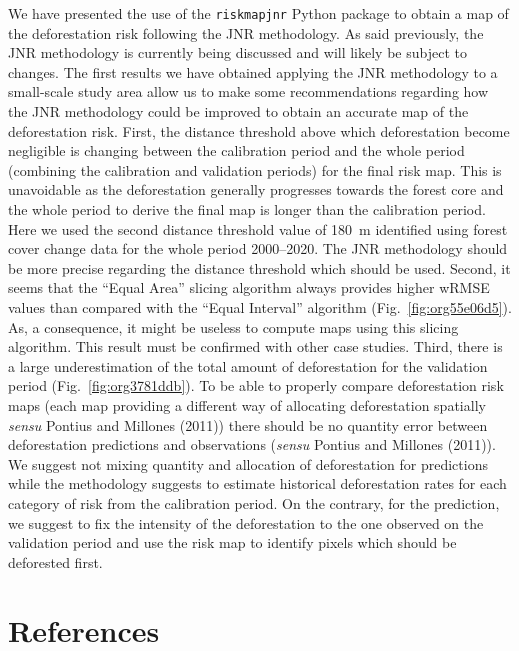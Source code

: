\documentclass[paper=a4, 12pt, DIV=12]{scrartcl}
\makeatletter
\newcommand{\citeprocitem}[2]{\hyper@linkstart{cite}{citeproc_bib_item_#1}#2\hyper@linkend}
\makeatother
\begin{document}
We have presented the use of the \texttt{riskmapjnr} Python package to obtain a map of the deforestation risk following the JNR methodology. As said previously, the JNR methodology is currently being discussed and will likely be subject to changes. The first results we have obtained applying the JNR methodology to a small-scale study area allow us to make some recommendations regarding how the JNR methodology could be improved to obtain an accurate map of the deforestation risk. First, the distance threshold above which deforestation become negligible is changing between the calibration period and the whole period (combining the calibration and validation periods) for the final risk map. This is unavoidable as the deforestation generally progresses towards the forest core and the whole period to derive the final map is longer than the calibration period. Here we used the second distance threshold value of 180 m identified using forest cover change data for the whole period 2000--2020. The JNR methodology should be more precise regarding the distance threshold which should be used. Second, it seems that the ``Equal Area'' slicing algorithm always provides higher wRMSE values than compared with the ``Equal Interval'' algorithm (Fig. \ref{fig:org55e06d5}). As, a consequence, it might be useless to compute maps using this slicing algorithm. This result must be confirmed with other case studies. Third, there is a large underestimation of the total amount of deforestation for the validation period (Fig. \ref{fig:org3781ddb}). To be able to properly compare deforestation risk maps (each map providing a different way of allocating deforestation spatially \emph{sensu} Pontius and Millones (\citeprocitem{3}{2011})) there should be no quantity error between deforestation predictions and observations (\emph{sensu} Pontius and Millones (\citeprocitem{3}{2011})). We suggest not mixing quantity and allocation of deforestation for predictions while the methodology suggests to estimate historical deforestation rates for each category of risk from the calibration period. On the contrary, for the prediction, we suggest to fix the intensity of the deforestation to the one observed on the validation period and use the risk map to identify pixels which should be deforested first. 

\section{References}
\label{sec:orgb00c599}
\end{document}
